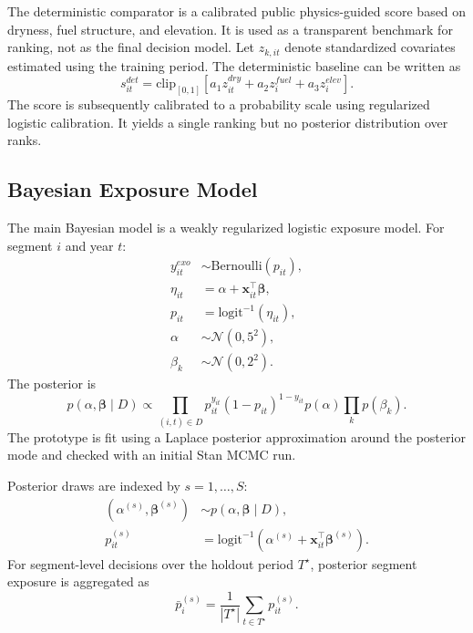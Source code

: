 \documentclass[11pt]{article}
\begin{document}
The deterministic comparator is a calibrated public physics-guided score based
on dryness, fuel structure, and elevation. It is used as a transparent benchmark
for ranking, not as the final decision model. Let $z_{k,it}$ denote standardized
covariates estimated using the training period. The deterministic baseline can
be written as
\begin{equation}
s_{it}^{det}
= \mathrm{clip}_{[0,1]}
\left[
a_1 z^{dry}_{it}
+ a_2 z^{fuel}_{i}
+ a_3 z^{elev}_{i}
\right].
\end{equation}
The score is subsequently calibrated to a probability scale using regularized
logistic calibration. It yields a single ranking but no posterior distribution
over ranks.

\subsection{Bayesian Exposure Model}

The main Bayesian model is a weakly regularized logistic exposure model. For
segment $i$ and year $t$:
\begin{align}
y^{exo}_{it} &\sim \mathrm{Bernoulli}(p_{it}), \\
\eta_{it} &= \alpha + \mathbf{x}_{it}^{\top}\boldsymbol{\beta}, \\
p_{it} &= \mathrm{logit}^{-1}(\eta_{it}), \\
\alpha &\sim \mathcal{N}(0, 5^2), \\
\beta_k &\sim \mathcal{N}(0, 2^2).
\end{align}
The posterior is
\begin{equation}
p(\alpha,\boldsymbol{\beta}\mid D)
\propto
\prod_{(i,t)\in D}
p_{it}^{y_{it}}(1-p_{it})^{1-y_{it}}
p(\alpha)\prod_k p(\beta_k).
\end{equation}
The prototype is fit using a Laplace posterior approximation around the
posterior mode and checked with an initial Stan MCMC run.

Posterior draws are indexed by $s=1,\ldots,S$:
\begin{align}
(\alpha^{(s)},\boldsymbol{\beta}^{(s)})
&\sim p(\alpha,\boldsymbol{\beta}\mid D), \\
p_{it}^{(s)}
&= \mathrm{logit}^{-1}
\left(\alpha^{(s)}+\mathbf{x}_{it}^{\top}\boldsymbol{\beta}^{(s)}\right).
\end{align}
For segment-level decisions over the holdout period $T^\star$, posterior segment
exposure is aggregated as
\begin{equation}
\bar{p}_{i}^{(s)}
= \frac{1}{|T^\star|}
\sum_{t\in T^\star} p_{it}^{(s)}.
\end{equation}
\end{document}
